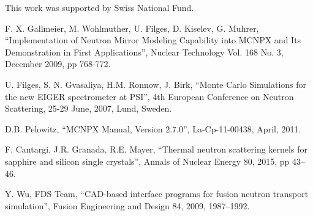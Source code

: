 \documentclass[a4paper,
              ]{jacow}
\begin{document}
This work was supported by Swiss National Fund.

\begin{thebibliography}{9}   %

  F. X. Gallmeier, M. Wohlmuther, U. Filges, D. Kiselev, G. Muhrer,
  ``Implementation of Neutron Mirror Modeling Capability into MCNPX and Its Demonstration in First Applications'',
  Nuclear Technology Vol. 168 No. 3, December 2009, pp 768-772. 

  U. Filges, S. N. Gvasaliya, H.M. Ronnow, J. Birk,
  ``Monte Carlo Simulations for the new EIGER spectrometer at PSI'',
  4th European Conference on Neutron Scattering, 25-29 June, 2007, Lund, Sweden. 

   D.B. Pelowitz,
   ``MCNPX Manual, Version 2.7.0'',
   La-Cp-11-00438, April, 2011.

  F. Cantargi, J.R. Granada, R.E. Mayer, 
  ``Thermal neutron scattering kernels for sapphire and silicon single crystals'', 
  Annals of Nuclear Energy 80, 2015, pp 43–46.  

  Y. Wu, FDS Team, 
  ``CAD-based interface programs for fusion neutron transport simulation'', 
  Fusion Engineering and Design 84, 2009, 1987–1992.








\end{thebibliography}
\end{document}
